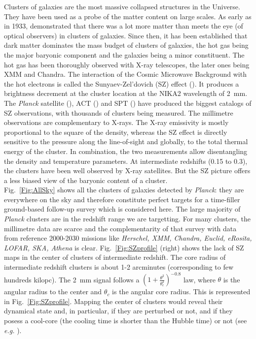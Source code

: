 \documentclass[11pt,a4paper,twoside,graphicx,color]{article}
\begin{document}
\vspace{-0.1cm}  Clusters
of galaxies are the most massive collapsed structures in the
Universe. They have been used as a probe of the matter content on
large scales. As early as in 1933, \cite{Zwicky1933} demonstrated that
there was a lot more matter than meets the eye (of optical observers)
in clusters of galaxies. Since then, it has been established that dark
matter dominates the mass budget of clusters of galaxies, the hot gas
being the major baryonic component and the galaxies being a minor
constituent. The hot gas has been thoroughly observed with X-ray
telescopes, the later ones being XMM and Chandra. The interaction of
the Cosmic Microwave Background with the hot electrons is called the
Sunyaev-Zel'dovich (SZ) effect (\cite{SZ1972}). It produces a
brightness decrement at the cluster location at the NIKA2 wavelength
of 2~mm.  The {\sl Planck} satellite (\cite{PSZ2}), ACT
(\cite{Hasselfield}) and SPT (\cite{Bleem2014}) have produced the
biggest catalogs of SZ observations, with thousands of clusters being
measured. The millimetre observations are complementary to X-rays. The
X-ray emissivity is mostly proportional to the square of the density,
whereas the SZ effect is directly sensitive to the pressure along the
line-of-sight and globally, to the total thermal energy of the
cluster. In combination, the two measurements allow disentangling the
density and temperature parameters. At intermediate redshifts (0.15 to
0.3), the clusters have been well observed by X-ray satellites. But
the SZ picture offers a less biased view of the baryonic content of a
cluster. \\


Fig.~\ref{Fig:AllSky} shows all the clusters of galaxies detected by
{\sl Planck}: they are everywhere on the sky and therefore constitute
perfect targets for a time-filler ground-based follow-up survey which
is considered here. The large majority of {\sl Planck} clusters are in
the redshift range we are targetting. For many clusters, the
millimetre data are scarce and the complementarity of that survey with
data from reference 2000-2030 missions like {\sl Herschel, XMM,
  Chandra, Euclid, eRosita, LOFAR, SKA, Athena} is
clear. Fig.~\ref{Fig:SZprofile} (right) shows the lack of SZ maps in
the center of clusters of intermediate redshift. The core radius of
intermediate redshift clusters is about 1-2 arcminutes (corresponding
to few hundreds kilopc). The 2~mm signal follows a
$(1+\frac{\theta^2}{\theta_c^2 })^{-0.8}$ law, where $\theta$ is the
angular radius to the center and $\theta_c$ is the angular core
radius. This is represented in Fig.~\ref{Fig:SZprofile}. Mapping the
center of clusters would reveal their dynamical state and, in
particular, if they are perturbed or not, and if they posess a
cool-core (the cooling time is shorter than the Hubble time) or not
(see {\sl e.g.} \cite{Hudson2010}). \\
\end{document}
